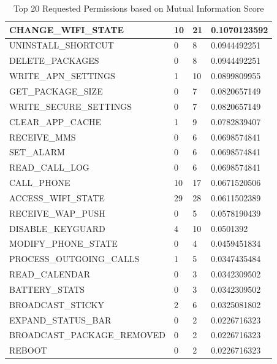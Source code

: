 \begin{table}[]
\begin{tabular}{|l|l|l|l|}
CHANGE\_WIFI\_STATE         & 10              & 21               & 0.1070123592      \\ \hline
UNINSTALL\_SHORTCUT         & 0               & 8                & 0.0944492251      \\ \hline
DELETE\_PACKAGES            & 0               & 8                & 0.0944492251      \\ \hline
WRITE\_APN\_SETTINGS        & 1               & 10               & 0.0899809955      \\ \hline
GET\_PACKAGE\_SIZE          & 0               & 7                & 0.0820657149      \\ \hline
WRITE\_SECURE\_SETTINGS     & 0               & 7                & 0.0820657149      \\ \hline
CLEAR\_APP\_CACHE           & 1               & 9                & 0.0782839407      \\ \hline
RECEIVE\_MMS                & 0               & 6                & 0.0698574841      \\ \hline
SET\_ALARM                  & 0               & 6                & 0.0698574841      \\ \hline
READ\_CALL\_LOG             & 0               & 6                & 0.0698574841      \\ \hline
CALL\_PHONE                 & 10              & 17               & 0.0671520506      \\ \hline
ACCESS\_WIFI\_STATE         & 29              & 28               & 0.0611502389      \\ \hline
RECEIVE\_WAP\_PUSH          & 0               & 5                & 0.0578190439      \\ \hline
DISABLE\_KEYGUARD           & 4               & 10               & 0.0501392         \\ \hline
MODIFY\_PHONE\_STATE        & 0               & 4                & 0.0459451834      \\ \hline
PROCESS\_OUTGOING\_CALLS    & 1               & 5                & 0.0347435484      \\ \hline
READ\_CALENDAR              & 0               & 3                & 0.0342309502      \\ \hline
BATTERY\_STATS              & 0               & 3                & 0.0342309502      \\ \hline
BROADCAST\_STICKY           & 2               & 6                & 0.0325081802      \\ \hline
EXPAND\_STATUS\_BAR         & 0               & 2                & 0.0226716323      \\ \hline
BROADCAST\_PACKAGE\_REMOVED & 0               & 2                & 0.0226716323      \\ \hline
REBOOT                      & 0               & 2                & 0.0226716323      \\ \hline
\end{tabular}
\caption{Top 20 Requested Permissions based on Mutual Information Score}\label{MIScore}
\end{table}
\normalsize

